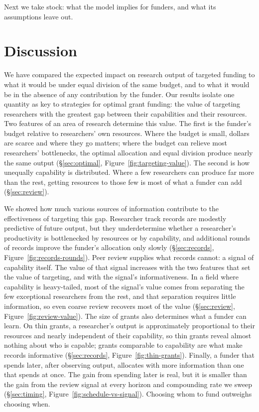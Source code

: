 \documentclass[article, 11pt, reqno]{amsart}
\theoremstyle{named}
\begin{document}


Next we take stock: what the model implies for funders, and what its assumptions leave out.

\section{Discussion}\label{sec:discussion}

We have compared the expected impact on research output of targeted funding to what it would be under equal division of the same budget, and to what it would be in the absence of any contribution by the funder. Our results isolate one quantity as key to strategies for optimal grant funding: the value of targeting researchers with the greatest gap between their capabilities and their resources. Two features of an area of research determine this value. The first is the funder's budget relative to researchers' own resources. Where the budget is small, dollars are scarce and where they go matters; where the budget can relieve most researchers' bottlenecks, the optimal allocation and equal division produce nearly the same output (\S\ref{sec:optimal}, Figure~\ref{fig:targeting-value}). The second is how unequally capability is distributed. Where a few researchers can produce far more than the rest, getting resources to those few is most of what a funder can add (\S\ref{sec:review}).

We showed how much various sources of information contribute to the effectiveness of targeting this gap. Researcher track records are modestly predictive of future output, but they underdetermine whether a researcher's productivity is bottlenecked by resources or by capability, and additional rounds of records improve the funder's allocation only slowly (\S\ref{sec:records}, Figure~\ref{fig:records-rounds}). Peer review supplies what records cannot: a signal of capability itself. The value of that signal increases with the two features that set the value of targeting, and with the signal's informativeness. In a field where capability is heavy-tailed, most of the signal's value comes from separating the few exceptional researchers from the rest, and that separation requires little information, so even coarse review recovers most of the value (\S\ref{sec:review}, Figure~\ref{fig:review-value}). The size of grants also determines what a funder can learn. On thin grants, a researcher's output is approximately proportional to their resources and nearly independent of their capability, so thin grants reveal almost nothing about who is capable; grants comparable to capability are what make records informative (\S\ref{sec:records}, Figure~\ref{fig:thin-grants}). Finally, a funder that spends later, after observing output, allocates with more information than one that spends at once. The gain from spending later is real, but it is smaller than the gain from the review signal at every horizon and compounding rate we sweep (\S\ref{sec:timing}, Figure~\ref{fig:schedule-vs-signal}). Choosing whom to fund outweighs choosing when.
\end{document}
